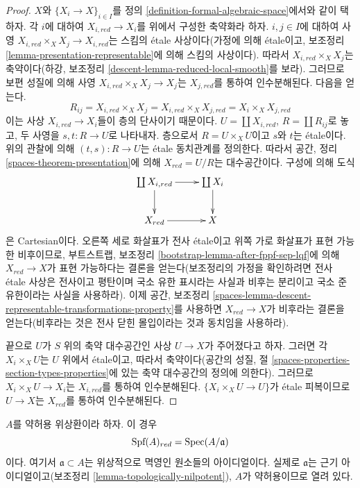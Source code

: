 \begin{proof}
\medskip\noindent
$X$와 $\{X_i \to X\}_{i \in I}$를 정의
\ref{definition-formal-algebraic-space}에서와 같이 택하자.
각 $i$에 대하여 $X_{i, red} \to X_i$를 위에서 구성한 축약화라
하자. $i, j \in I$에 대하여 사영
$X_{i, red} \times_X X_j \to X_{i, red}$는 스킴의 \'etale
사상이다(가정에 의해 \'etale이고, 보조정리
\ref{lemma-presentation-representable}에 의해 스킴의 사상이다).
따라서 $X_{i, red} \times_X X_j$는 축약이다(하강, 보조정리
\ref{descent-lemma-reduced-local-smooth}를 보라). 그러므로 보편
성질에 의해 사영 $X_{i, red} \times_X X_j \to X_j$는
$X_{j, red}$를 통하여 인수분해된다. 다음을 얻는다.
$$
R_{ij} = X_{i, red} \times_X X_j = X_{i, red} \times_X X_{j, red} =
X_i \times_X X_{j, red}
$$
이는 사상 $X_{i, red} \to X_i$들이 층의 단사이기 때문이다.
$U = \coprod X_{i, red}$, $R = \coprod R_{ij}$로 놓고, 두 사영을
$s, t : R \to U$로 나타내자. 층으로서 $R = U \times_X U$이고
$s$와 $t$는 \'etale이다.
위의 관찰에 의해 $(t, s) : R \to U$는 \'etale 동치관계를
정의한다. 따라서 공간, 정리 \ref{spaces-theorem-presentation}에
의해 $X_{red} = U/R$는 대수공간이다. 구성에 의해 도식
$$
\xymatrix{
\coprod X_{i, red} \ar[r] \ar[d] & \coprod X_i \ar[d] \\
X_{red} \ar[r] & X
}
$$
은 Cartesian이다. 오른쪽 세로 화살표가 전사 \'etale이고 위쪽
가로 화살표가 표현 가능한 비후이므로, 부트스트랩, 보조정리
\ref{bootstrap-lemma-after-fppf-sep-lqf}에 의해
$X_{red} \to X$가 표현 가능하다는 결론을 얻는다(보조정리의 가정을
확인하려면 전사 \'etale 사상은 전사이고 평탄이며 국소 유한 표시라는
사실과 비후는 분리이고 국소 준유한이라는 사실을 사용하라).
이제 공간, 보조정리
\ref{spaces-lemma-descent-representable-transformations-property}를
사용하면 $X_{red} \to X$가 비후라는 결론을 얻는다(비후라는 것은
전사 닫힌 몰입이라는 것과 동치임을 사용하라).

\medskip\noindent
끝으로 $U$가 $S$ 위의 축약 대수공간인 사상 $U \to X$가
주어졌다고 하자. 그러면 각 $X_i \times_X U$는 $U$ 위에서
\'etale이고, 따라서 축약이다(공간의 성질, 절
\ref{spaces-properties-section-types-properties}에 있는 축약
대수공간의 정의에 의한다). 그러므로
$X_i \times_X U \to X_i$는 $X_{i, red}$를 통하여 인수분해된다.
$\{X_i \times_X U \to U\}$가 \'etale 피복이므로
$U \to X$는 $X_{red}$를 통하여 인수분해된다.
\end{proof}

\begin{example}
\label{example-reduction-affine-formal-spectrum}
$A$를 약허용 위상환이라 하자. 이 경우
$$
\text{Spf}(A)_{red} = \mathop{\mathrm{Spec}}(A/\mathfrak a)
$$
이다. 여기서 $\mathfrak a \subset A$는 위상적으로 멱영인 원소들의
아이디얼이다. 실제로 $\mathfrak a$는 근기 아이디얼이고(보조정리
\ref{lemma-topologically-nilpotent}), $A$가 약허용이므로 열려 있다.
\end{example}

